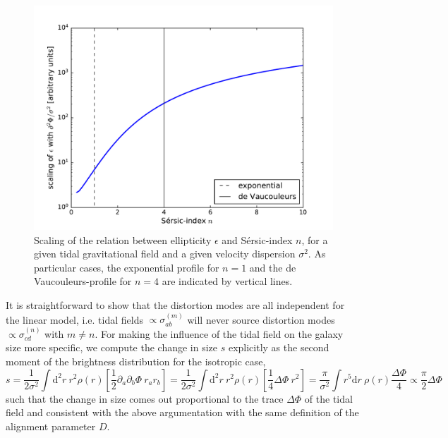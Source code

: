 \documentclass[a4paper,fleqn,usenatbib]{mnras}
\newcommand{\dd}{\mathrm{d}}
\begin{document}
\begin{figure}
\centering
\includegraphics[scale=0.45]{./figures/sersic_scaling.pdf}
\caption{Scaling of the relation between ellipticity $\epsilon$ and S{\'e}rsic-index $n$, for a given tidal gravitational field and a given velocity dispersion $\sigma^2$. As particular cases, the exponential profile for $n=1$ and the de Vaucouleurs-profile for $n=4$ are indicated by vertical lines.}
\label{fig_sersic_scaling}
\end{figure}

It is straightforward to show that the distortion modes are all independent for the linear model, i.e. tidal fields $\propto\sigma^{(m)}_{ab}$ will never source distortion modes $\propto\sigma^{(n)}_{cd}$ with $m\neq n$. For making the influence of the tidal field on the galaxy size more specific, we compute the change in size $s$ explicitly as the second moment of the brightness distribution for the isotropic case,
\begin{equation}
s = 
\frac{1}{2\sigma^2}\int\dd^2r\:r^2\rho(r)\left[\frac{1}{2}\partial_a\partial_b\Phi\: r_ar_b\right] =
\frac{1}{2\sigma^2}\int\dd^2r\:r^2\rho(r)\left[\frac{1}{4}\Delta\Phi\:r^2\right] = 
\frac{\pi}{\sigma^2}\int r^5\dd r\:\rho(r)\frac{\Delta\Phi}{4} \propto \frac{\pi}{2}\Delta\Phi
\end{equation}
such that the change in size comes out proportional to the trace $\Delta\Phi$ of the tidal field and consistent with the above argumentation with the same definition of the alignment parameter $D$. 
\end{document}
